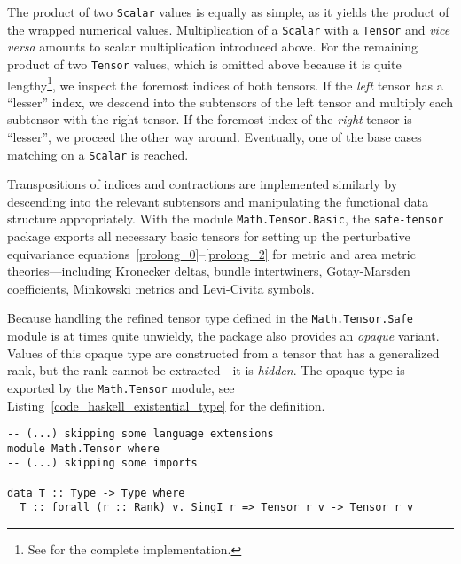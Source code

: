 The product of two \texttt{Scalar} values is equally as simple, as it yields the product of the wrapped numerical values. Multiplication of a \texttt{Scalar} with a \texttt{Tensor} and \emph{vice versa} amounts to scalar multiplication introduced above. For the remaining product of two \texttt{Tensor} values, which is omitted above because it is quite lengthy\footnote{See \cite{Alex_2020_safe-tensor} for the complete implementation.}, we inspect the foremost indices of both tensors. If the \emph{left} tensor has a ``lesser'' index, we descend into the subtensors of the left tensor and multiply each subtensor with the right tensor. If the foremost index of the \emph{right} tensor is ``lesser'', we proceed the other way around. Eventually, one of the base cases matching on a \texttt{Scalar} is reached.

Transpositions of indices and contractions are implemented similarly by descending into the relevant subtensors and manipulating the functional data structure appropriately. With the module \texttt{Math.Tensor.Basic}, the \texttt{safe-tensor} package exports all necessary basic tensors for setting up the perturbative equivariance equations~\ref{prolong_0}--\ref{prolong_2} for metric and area metric theories---including Kronecker deltas, bundle intertwiners, Gotay-Marsden coefficients, Minkowski metrics and Levi-Civita symbols.

Because handling the refined tensor type defined in the \texttt{Math.Tensor.Safe} module is at times quite unwieldy, the package also provides an \emph{opaque} variant. Values of this opaque type are constructed from a tensor that has a generalized rank, but the rank cannot be extracted---it is \emph{hidden}. The opaque type is exported by the \texttt{Math.Tensor} module, see Listing~\ref{code_haskell_existential_type} for the definition.

\begin{code}
  \begin{verbatim}
-- (...) skipping some language extensions
module Math.Tensor where
-- (...) skipping some imports

data T :: Type -> Type where
  T :: forall (r :: Rank) v. SingI r => Tensor r v -> Tensor r v
  \end{verbatim}
  \label{code_haskell_existential_type}
\end{code}


